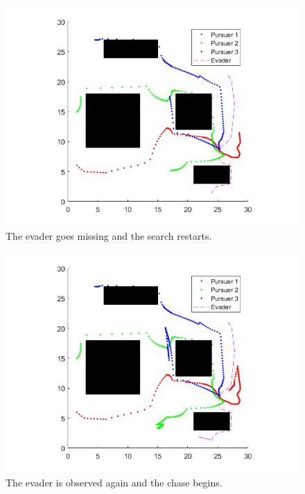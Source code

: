 \documentclass[ebook,11pt] {kth-mag}
\begin{document}
\begin{figure}[H]
\includegraphics[scale=0.4]{c1-3}
\centering
\caption{The evader goes missing and the search restarts.}
\end{figure}

\begin{figure}[H]
\includegraphics[scale=0.4]{c1-4}
\centering
\caption{The evader is observed again and the chase begins.}
\end{figure}
\end{document}
